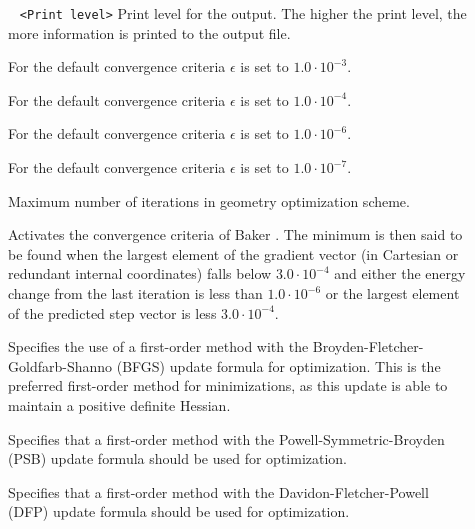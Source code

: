 \begin{description}
\item[]\verb| | \newline
\verb|<Print level>|\newline
Print level for the output. The higher the print level, the more information
is printed to the output file.

\item[]
For the default convergence criteria $\epsilon$ is set to $1.0\cdot 10^{-3}$.

\item[]
For the default convergence criteria $\epsilon$ is set to $1.0\cdot 10^{-4}$.

\item[]
For the default convergence criteria $\epsilon$ is set to $1.0\cdot 10^{-6}$.

\item[]
For the default convergence criteria $\epsilon$ is set to $1.0\cdot 10^{-7}$.

\item[]
Maximum number of iterations in geometry optimization scheme.

\item[]
Activates the convergence criteria of Baker \cite{Baker}. The minimum
is then said to be found when the largest element of the gradient
vector (in Cartesian or redundant internal coordinates) falls below
$3.0\cdot 10^{-4}$ and either the energy change from the last
iteration is less than $1.0\cdot 10^{-6}$ or the largest element of
the predicted step vector is less $3.0\cdot 10^{-4}$.

\item[]
Specifies the use of a first-order method
with the Broyden-Fletcher-Goldfarb-Shanno (BFGS)
update formula for optimization. This is the
preferred first-order method for minimizations, as this update is able
to maintain a positive definite Hessian. 

\item[]
Specifies that a first-order method with the
Powell-Symmetric-Broyden (PSB) 
update formula should be used for optimization.

\item[]
Specifies that a first-order method with the
Davidon-Fletcher-Powell (DFP) update formula should be used for optimization. 


\end{description}
